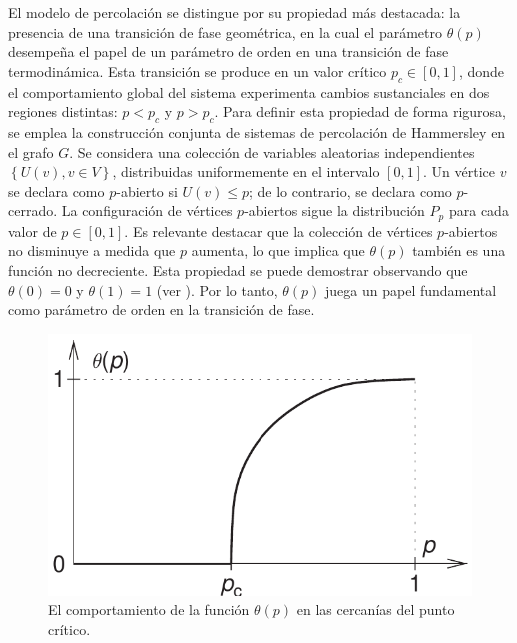 El modelo de percolación se distingue por su propiedad más destacada: la presencia de una transición de fase geométrica, en la cual el parámetro $\theta(p)$ desempeña el papel de un parámetro de orden en una transición de fase termodinámica. Esta transición se produce en un valor crítico $p_c \in  [0 , 1]$, donde el comportamiento global del sistema experimenta cambios sustanciales en dos regiones distintas: $p < p_c$ y $p > p_c$.  Para definir esta propiedad de forma rigurosa, se emplea la construcción conjunta de sistemas de percolación de Hammersley \cite{broadbent_percolation_1957}  en el grafo $G$. Se considera una colección de variables aleatorias independientes $\left\{U(v),v\in V\right\}$, distribuidas uniformemente en el intervalo $[0,1]$. Un vértice $v$ se declara como $p$-abierto si $U(v) \leq p$; de lo contrario, se declara como $p$-cerrado. La configuración de vértices $p$-abiertos sigue la distribución $P_p$ para cada valor de $p\in [0, 1]$. Es relevante destacar que la colección de vértices $p$-abiertos no disminuye a medida que $p$ aumenta, lo que implica que $\theta(p)$ también es una función no decreciente. Esta propiedad se puede demostrar observando que $\theta(0) = 0$ y $\theta(1) = 1$  (ver ). Por lo tanto, $\theta(p)$  juega un papel fundamental como parámetro de orden en la transición de fase.



\begin{figure}[ht]
	\centering\includegraphics[width=\imsize]{probabilidadtheta.png}
	\caption[El comportamiento de la función $\theta(p)$ en las cercanías del punto crítico.]{El comportamiento de la función $\theta(p)$ en las cercanías del punto crítico.}\label{fig:probabilidadtheta}
\end{figure}


